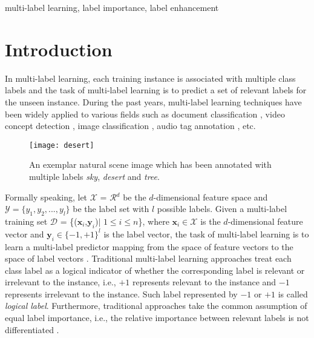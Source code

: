 \documentclass[conference]{IEEEtran}
\begin{document}
\begin{IEEEkeywords}
multi-label learning, label importance, label enhancement
\end{IEEEkeywords}

\section{Introduction}
In multi-label learning, each training instance is associated with multiple class labels and the task of multi-label learning is to predict a set of relevant labels for the unseen instance. During the past years, multi-label learning techniques have been widely applied to various fields such as document classification \cite{rubin2012statistical}, video concept detection \cite{wang2011transductive}, image classification \cite{cabral2011matrix}, audio tag annotation \cite{lo2011cost}, etc.

\begin{figure}[h]
\centering\texttt{[image: desert]}
\caption{An exemplar natural scene image which has been annotated with multiple labels \emph{sky}, \emph{desert} and \emph{tree}.}
\end{figure}

Formally speaking, let $\mathcal{X}$ = $\mathcal{R}$$^d$  be the $d$-dimensional feature space and $\mathcal{Y}=\{y_1, y_2, ... , y_l\}$ be the label set with $l$ possible labels. Given a multi-label training set $\mathcal{D}$ = \{($\bm{x}_i$,$\bm{y}_i$)$|$ $1 \leq i\leq n$\}, where $\bm{x}_i \in \mathcal{X}$ is the $d$-dimensional feature vector and $\bm{y}_i\in\{-1,+1\}^l$ is the label vector, the task of multi-label learning is to learn a multi-label predictor mapping from the space of feature vectors to the space of label vectors \cite{tsoumakas2010mining}. Traditional multi-label learning approaches treat each class label as a logical indicator of whether the corresponding label is relevant or irrelevant to the instance, i.e., $+1$ represents relevant to the instance and $-1$ represents irrelevant to the instance. Such label represented by $-1$ or $+1$ is called \emph{logical label}. Furthermore, traditional approaches take the common assumption of equal label importance, i.e., the relative importance between relevant labels is not differentiated \cite{zhang2014review}.
\end{document}
